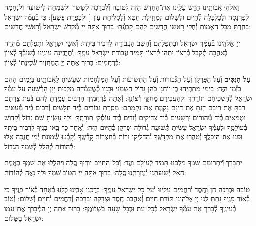 \documentclass[twoside, openany, parskip=half, 11pt]{book}
\begin{document}
וֵאלֹהֵי אֲבוֹתֵֽינוּ חַדֵּשׁ עָלֵֽינוּ אֶת־הַחֹֽדֶשׁ הַזֶּה לְ֯טוֹבָה וְ֯לִבְרָכָה לְ֯שָׂשׂוֹן וּלְשִׂמְחָה לִישׁוּעָה וּלְנֶחָמָה לְ֯פַרְנָסָה וּלְכַלְכָּלָה לְ֯חַיִּים וּלְשָׁלוֹם לִמְחִֽילַת חֵטְא וְ֯לִסְלִיחַת עָוֹן [
וּלְכַפָּרַת פָּֽשַׁע]: כִּי בְ֯עַמְּ֯ךָ יִשְׂרָאֵל בָּחַֽרְתָּ מִכׇּל־הָאֻמּוֹת וְ֯חֻקֵּי רָאשֵׁי חֳדָשִׁים לָהֶם קָבָֽעְ֯תָּ: בָּרוּךְ אַתָּה יְיָ מְ֯קַדֵּשׁ יִשְׂרָאֵל וְ֯רָאשֵׁי חֳדָשִׁים:

\nextpage
{}
יְיָ אֱלֹהֵֽינוּ בְּ֯עַמְּ֯ךָ יִשְׂרָאֵל וּבִתְפִלָּתָם וְ֯הָשֵׁב הָעֲבוֹדָה לִדְבִיר בֵּיתֶֽךָ: וְ֯אִשֵּׁי יִשְׂרָאֵל וּתְפִלָּתָם מְ֯הֵרָה בְּ֯אַהֲבָה תְ֯קַבֵּל בְּ֯רָצוֹן וּתְהִי לְ֯רָצוֹן תָּמִיד עֲבוֹדַת יִשְׂרָאֵל עַמֶּֽךָ: וְ֯תֶחֱזֶֽינָה עֵינֵֽינוּ בְּ֯שׁוּבְ֯ךָ לְ֯צִיּוֹן בְּ֯רַחֲמִים: בָּרוּךְ אַתָּה יְיָ הַמַּחֲזִיר שְׁ֯כִינָתוֹ לְ֯צִיּוֹן:

\modim

\enlargethispage{\baselineskip}

\begin{sometimes}

\textbf{עַל הַנִּסִּים}
וְ֯עַל הַפֻּרְקָן וְ֯עַל הַגְּ֯בוּרוֹת וְ֯עַל הַתְּ֯שׁוּעוֹת וְ֯עַל הַמִּלְחָמוֹת
שֶׁעָשִֽׂיתָ לַאֲבוֹתֵֽינוּ בַּיָּמִים הָהֵם בַּזְּ֯מַן הַזֶּה:
בִּימֵי מַתִּתְיָֽהוּ בֶּן יוֹחָנָן כֹּהֵן גָּדוֹל חַשְׁמֹנַי וּבָנָיו כְּ֯שֶׁעָמְ֯דָה מַלְכוּת יָוָן הָרְ֯שָׁעָה עַל עַמְּ֯ךָ יִשְׂרָאֵל לְ֯הַשְׁכִּיחָם תּוֹרָתֶֽךָ וּלְהַעֲבִירָם מֵחֻקֵּי רְ֯צוֹנֶֽךָ: וְ֯אַתָּה בְּ֯רַחֲמֶֽיךָ הָרַבִּים עָמַֽדְתָּ לָהֶם בְּ֯עֵת צָרָתָם רַֽבְתָּ אֶת־רִיבָם דַּֽנְתָּ אֶת־דִּינָם נָקַֽמְתָּ אֶת־נִקְמָתָם: מָסַֽרְתָּ גִּבּוֹרִים בְּ֯יַד חַלָּשִׁים וְ֯רַבִּים בְּ֯יַד מְ֯עַטִּים וּטְמֵאִים בְּ֯יַד טְ֯הוֹרִים וּרְשָׁעִים בְּ֯יַד צַדִּיקִים וְ֯זֵדִים בְּ֯יַד עוֹסְ֯קֵי תוֹרָתֶֽךָ: וּלְךָ עָשִֽׂיתָ שֵׁם גָּדוֹל וְ֯קָדוֹשׁ בְּ֯עוֹלָמֶֽךָ וּלְעַמְּ֯ךָ יִשְׂרָאֵל עָשִֽׂיתָ תְּ֯שׁוּעָה גְ֯דוֹלָה וּפֻרְקָן כְּ֯הַיּוֹם הַזֶּה: וְ֯אַֽחַר כַּךְ בָּֽאוּ בָנֶֽיךָ לִדְבִיר בֵּיתֶֽךָ וּפִנּוּ אֶת־הֵיכָלֶֽךָ וְ֯טִהֲרוּ אֶת־מִקְדָּשֶֽׁךָ וְ֯הִדְלִֽיקוּ נֵרוֹת בְּ֯חַצְרוֹת קׇׇׇׇׇׇׇׇׇׇׇדְּ֯שֶֽׁךָ וְ֯קָבְ֯עוּ שְׁ֯מוֹנַת יְ֯מֵי חֲנֻכָּה אֵֽלּוּ לְ֯הוֹדוֹת לְ֯הַלֵּל לְ֯שִׁמְךָ הַגָּדוֹל:

\end{sometimes}

\nextpage

יִתְבָּרַךְ וְ֯יִתְרוֹמַם שִׁמְךָ מַלְכֵּֽנוּ תָּמִיד לְ֯עוֹלָם וָעֶד:
וְ֯כׇל־הַחַיִּים יוֹדֽוּךָ סֶּֽלָה וִיהַלֲלוּ אֶת־שִׁמְךָ בֶּאֱמֶת הָאֵל יְ֯שׁוּעָתֵֽנוּ וְ֯עֶזְרָתֵֽנוּ סֶֽלָה: בָּרוּךְ אַתָּה יְיָ הַטּוֹב שִׁמְךָ וּלְךָ נָאֶה לְ֯הוֹדוֹת:


טוֹבָה וּבְרָכָה חֵן וָחֶֽסֶד וְ֯רַחֲמִים עָלֵֽינוּ וְ֯עַל כׇּל־יִשְׂרָאֵל עַמֶּֽךָ: בָּרֲכֵֽנוּ אָבִֽינוּ כֻּלָּֽנוּ כְּ֯אֶחָד בְּ֯אוֹר פָּנֶֽיךָ כִּי בְ֯אוֹר פָּנֶֽיךָ נָתַֽתָּ לָֽנוּ יְיָ אֱלֹהֵֽינוּ תּוֹרַת חַיִּים וְ֯אַהֲבַת חֶֽסֶד וּצְדָקָה וּבְרָכָה וְ֯רַחֲמִים וְ֯חַיִּים וְ֯שָׁלוֹם: וְ֯טוֹב בְּ֯עֵינֶֽיךָ לְ֯בָרֵךְ אֶת־עַמְּ֯ךָ יִשְׂרָאֵל בְּ֯כׇל־עֵת וּבְכׇל־שָׁעָה בִּשְׁלוֹמֶֽךָ: בָּרוּךְ אַתָּה יְיָ הַמְ֯בָרֵךְ אֶת־עַמּוֹ יִשְׂרָאֵל בַּשָּׁלוֹם:
\end{document}
